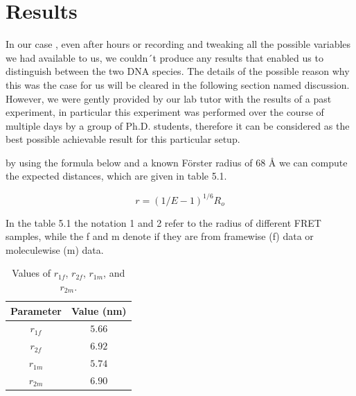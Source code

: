 \documentclass[a4paper,english,12pt,bibliography=totoc]{scrreprt}
\begin{document}
\section{Results}
\label{sec:Results} 
In our case , even after hours or recording and tweaking all the possible variables we had available to us, we couldn´t produce any results that enabled us to distinguish between the two DNA species. The details of the possible reason why this was the case for us will be cleared in the following section named discussion.
\newline
However, we were gently provided by our lab tutor with the results of a past experiment, in particular this experiment was performed over the course of multiple days by a group of Ph.D. students, therefore it can be considered as the best possible achievable result for this particular setup.\newline

by using the formula below and a known Förster radius of 68 Å we can compute the expected distances, which are given in table 5.1.

$$r = (1/E -1)^{1/6} R_o$$

In the table 5.1 the notation 1 and 2 refer to the radius of different FRET samples, while the f and m denote if they are from framewise (f) data or moleculewise (m) data.\\
\begin{table}[htbp]
\centering
\begin{tabular}{|c|c|}
\hline
Parameter & Value (nm) \\
\hline
$r_{1f}$ & $5.66$ \\
$r_{2f}$ & $6.92$ \\
$r_{1m}$ & $5.74$ \\
$r_{2m}$ & $6.90$ \\
\hline
\end{tabular}
\caption{Values of $r_{1f}$, $r_{2f}$, $r_{1m}$, and $r_{2m}$.}
\label{tab:values}
\end{table}

\end{document}
